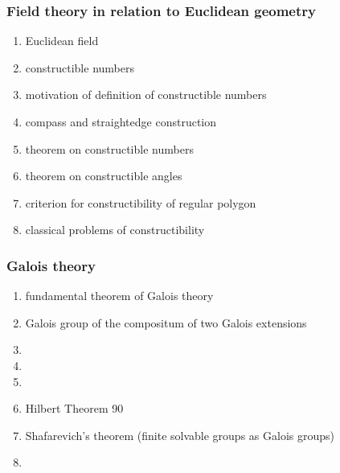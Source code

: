 \documentclass[12pt]{article}
\begin{document}
\subsubsection*{Field theory in relation to Euclidean geometry}
\begin{enumerate}
\item Euclidean field
\item constructible numbers
\item motivation of definition of constructible numbers
\item compass and straightedge construction
\item theorem on constructible numbers
\item theorem on constructible angles
\item criterion for constructibility of regular polygon
\item classical problems of constructibility
\end{enumerate}

\subsubsection*{Galois theory}
\begin{enumerate}
\item fundamental theorem of Galois theory
\item Galois group of the compositum of two Galois extensions
\item {}
\item {}
\item {}
\item Hilbert Theorem 90
\item Shafarevich's theorem (finite solvable groups as Galois groups)
\item {}
\end{enumerate}
\end{document}
